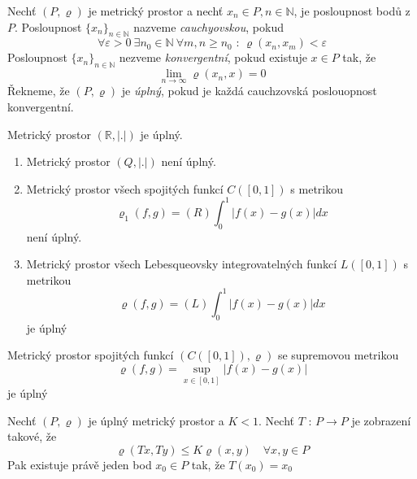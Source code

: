 \begin{definice}
Nechť $(P, \varrho)$ je metrický prostor a nechť $x_n \in P, n \in \mathbb{N}$, je posloupnost bodů z $P$. Posloupnost $\{ x_n \}_{n \in \mathbb{N}}$ nazveme \emph{cauchyovskou}, pokud
$$\forall \varepsilon > 0 \ \exists n_0 \in \mathbb{N} \ \forall m,n \geq n_0 \textrm{ : } \varrho(x_n, x_m) < \varepsilon$$
Posloupnost $\{ x_n \}_{n \in \mathbb{N}}$ nezveme \emph{konvergentní}, pokud existuje $x \in P$ tak, že
$$\lim_{n \rightarrow \infty} \varrho (x_n, x) = 0$$
Řekneme, že $(P, \varrho)$ je \emph{úplný}, pokud je každá cauchzovská poslouopnost konvergentní.
\end{definice}

\begin{vetal}
Metrický prostor $(\mathbb{R}, |.|)$ je úplný.
\end{vetal}

\begin{priklad}
\begin{enumerate}
\item Metrický prostor $(Q, |.|)$ není úplný.
\item Metrický prostor všech spojitých funkcí $C([0, 1])$ s metrikou
$$\varrho_1(f,g) = (R) \int_0^1 |f(x) - g(x)| dx$$
není úplný.
\item Metrický prostor všech Lebesqueovsky integrovatelných funkcí $L([0,1])$ s metrikou
$$\varrho(f,g) = (L) \int_0^1 |f(x)-g(x)|dx$$
je úplný
\end{enumerate}
\end{priklad}

\begin{vetat}
Metrický prostor spojitých funkcí $(C([0,1]), \varrho)$ se supremovou metrikou
$$\varrho(f,g) = \sup_{x \in [0,1]} |f(x) - g(x)|$$
je úplný
\end{vetat}

\begin{vetat}
\label{Banachova věta o kontrakci}
Nechť $(P, \varrho)$ je úplný metrický prostor a $K < 1$. Nechť $T \textrm{ : } P \rightarrow P$ je zobrazení takové, že 
$$\varrho(Tx, Ty) \leq K \varrho(x,y) \quad \forall x,y \in P$$
Pak existuje právě jeden bod $x_0 \in P$ tak, že $T(x_0)=x_0$
\end{vetat}

